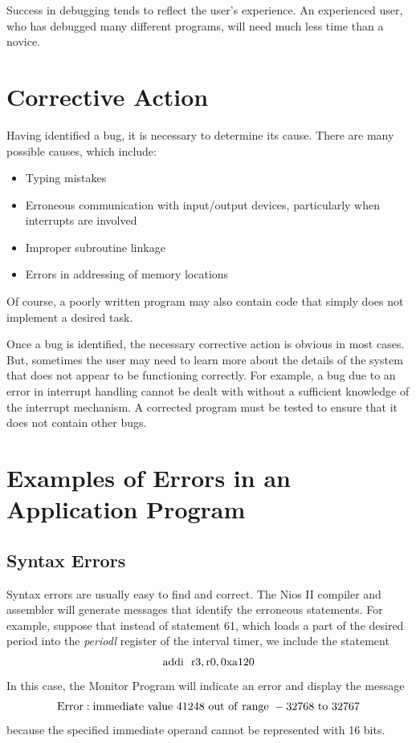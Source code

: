 \documentclass[11pt, twoside, pdftex]{article}
\begin{document}
Success in debugging tends to reflect the user's experience. An experienced
user, who has debugged many different programs, will need much less time
than a novice.

\section{Corrective Action}
Having identified a bug, it is necessary to determine its cause. There are
many possible causes, which include:
\begin{itemize}
\item Typing mistakes
\item Erroneous communication with input/output devices, particularly when
interrupts are involved
\item Improper subroutine linkage
\item Errors in addressing of memory locations
\end{itemize} 

\noindent
Of course, a poorly written program may also contain code that simply does not
implement a desired task.

Once a bug is identified, the necessary corrective action is obvious 
in most cases. But, sometimes the user may need to learn more about the
details of the system that does not appear to be functioning correctly.
For example, a bug due to an error in interrupt handling cannot be dealt
with without a sufficient knowledge of the interrupt mechanism.
A corrected program must be tested to ensure that it does not contain
other bugs.

\section{Examples of Errors in an Application Program}

\subsection{Syntax Errors}
Syntax errors are usually easy to find and correct. The Nios II compiler and assembler
will generate messages that identify the erroneous statements.
For example, suppose that instead of statement 61, which loads a part of the desired period
into the {\it periodl} register of the interval timer, we include the statement
$$
{\rm addi~~r3, r0, 0xa120}
$$
\noindent
In this case, the Monitor Program will indicate an error and display the message
$$
{\rm Error: immediate~value~41248~out~of~range~-32768~to~32767}
$$
\noindent
because the specified immediate operand cannot be represented with 16 bits.
\end{document}

